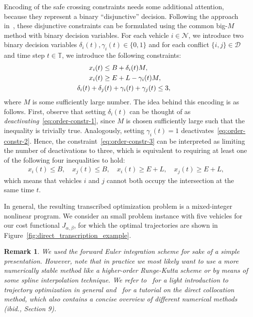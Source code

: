 \documentclass[a4paper]{report}
\theoremstyle{definition}
\theoremstyle{plain}
\newtheorem*{remark}{Remark}
\begin{document}
Encoding of the safe crossing constraints needs some additional attention,
because they represent a binary ``disjunctive'' decision.
%
Following the approach in~\cite{hultApproximateSolutionOptimal2015}, these disjunctive constraints can be formulated
using the common big-$M$ method with binary decision variables. For each vehicle
$i \in \mathcal{N}$, we introduce two binary decision variables
$\delta_{i}(t), \gamma_{i}(t) \in \{ 0, 1 \}$ and for each conflict $\{i, j\} \in \mathcal{D}$ and
time step $t \in \mathbb{T}$, we introduce the following constraints:
\begin{subequations}\label{eq:collision-avoidance-binary-encoding}
  \begin{align}
  x_{i}(t) &\leq B + \delta_{i}(t) M , \label{eq:order-constr-1} \\
  \quad x_{i}(t) &\geq E + L - \gamma_{i}(t) M , \label{eq:order-constr-2} \\
  & \hspace{-3.8em} \delta_{i}(t) + \delta_{j}(t) + \gamma_{i}(t) + \gamma_{j}(t) \leq 3 , \label{eq:order-constr-3}
  \end{align}
\end{subequations}
where $M$ is some sufficiently large number.
%
The idea behind this encoding is as follows.
%
First, observe that setting $\delta_{i}(t) $ can be thought of as
\emph{deactivating}~\eqref{eq:order-constr-1}, since $M$ is chosen sufficiently
large such that the inequality is trivially true. Analogously, setting
$\gamma_{i}(t) = 1$ deactivates~\eqref{eq:order-constr-2}.
%
Hence, the constraint~\eqref{eq:order-constr-3} can be interpreted as limiting
the number of deactivations to three, which is equivalent to requiring at least
one of the following four inequalities to hold:
\begin{align}
  x_{i}(t) \leq B, \quad x_{j}(t) \leq B , \quad
  x_{i}(t) \geq E + L, \quad x_{j}(t) \geq E + L ,
\end{align}
which means that vehicles $i$ and $j$ cannot both occupy the intersection at the
same time $t$.

In general, the resulting transcribed optimization problem is a mixed-integer
nonlinear program. We consider an small problem instance with five vehicles for
our cost functional $J_{\alpha,\beta}$, for which the optimal trajectories are
shown in Figure~\ref{fig:direct_transcription_example}.

\begin{remark}
  We used the forward Euler integration scheme for sake of a simple
  presentation. However, note that in practice we most likely want to use a more
  numerically stable method like a higher-order Runge-Kutta scheme or by means
  of some spline interpolation technique. We refer
  to~\cite{TrajectoryOptimization} for a light introduction to trajectory
  optimization in general and~\cite{kellyIntroductionTrajectoryOptimization2017} for a tutorial on the direct collocation
  method, which also contains a concise overview of different numerical methods
  (ibid., Section 9).
\end{remark}
\end{document}
